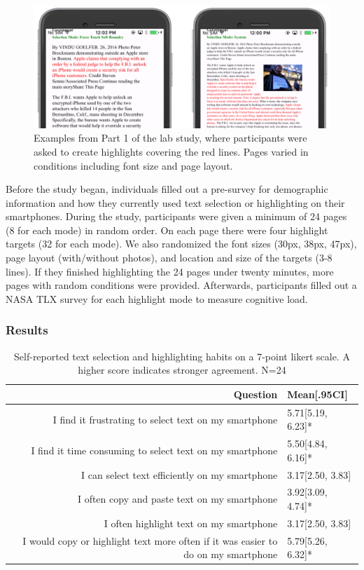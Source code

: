 \begin{figure}
    \centering
    \includegraphics[width=0.8\columnwidth]{Chapters/Highlight/img/training.png}
    \caption[Examples from the lab study]{Examples from Part 1 of the lab study, where participants were asked to create highlights covering the red lines. Pages varied in conditions including font size and page layout.}
    \label{fig:training_screenshot}
\end{figure}

Before the study began, individuals filled out a pre-survey for demographic information and how they currently used text selection or highlighting on their smartphones. During the study, participants were given a minimum of 24 pages (8 for each mode) in random order. On each page there were four highlight targets (32 for each mode). We also randomized the font sizes (30px, 38px, 47px), page layout (with/without photos), and location and size of the targets (3-8 lines).  If they finished highlighting the 24 pages under twenty minutes, more pages with random conditions were provided. Afterwards, participants filled out a NASA TLX survey for each highlight mode \cite{hart1988development} to measure cognitive load.

\subsubsection{Results}

\begin{table}
    \centering
    \footnotesize
    \begin{tabular}{r | l}
    \hline
    \textbf{Question} & \textbf{Mean[.95CI]} \\
    \hline
I find it frustrating to select text on my smartphone & 5.71[5.19, 6.23]* \\
I find it time consuming to select text on my smartphone & 5.50[4.84, 6.16]* \\
I can select text efficiently on my smartphone & 3.17[2.50, 3.83] \\
I often copy and paste text on my smartphone & 3.92[3.09, 4.74]* \\
I often highlight text on my smartphone & 3.17[2.50, 3.83] \\
I would copy or highlight text more often if it was easier to do on my smartphone & 5.79[5.26, 6.32]* \\
    \hline
    \end{tabular}
    \caption[Self-reported text selection and highlighting habits.]{Self-reported text selection and highlighting habits on a 7-point likert scale. A higher score indicates stronger agreement. N=24}
    \label{tab:text_selection}
\end{table}



